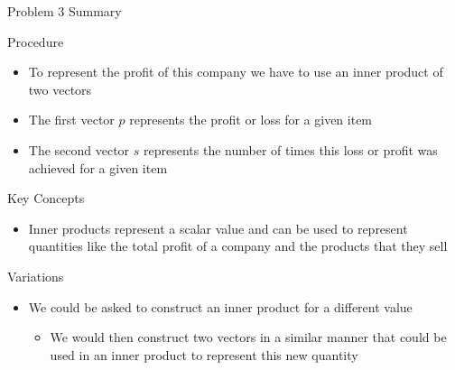 \begin{summary}{Problem 3 Summary}
    \begin{statement}{Procedure}
        \begin{itemize}
            \item To represent the profit of this company we have to use an inner product of two vectors
            \item The first vector $p$ represents the profit or loss for a given item
            \item The second vector $s$ represents the number of times this loss or profit was achieved for a given item
        \end{itemize}
    \end{statement}
    \begin{statement}{Key Concepts}
        \begin{itemize}
            \item Inner products represent a scalar value and can be used to represent quantities like the total profit of a company and the products that they sell
        \end{itemize}
    \end{statement}
    \begin{statement}{Variations}
        \begin{itemize}
            \item We could be asked to construct an inner product for a different value
            \begin{itemize}
                \item We would then construct two vectors in a similar manner that could be used in an inner product to represent this new quantity
            \end{itemize}
        \end{itemize}
    \end{statement}
\end{summary}

